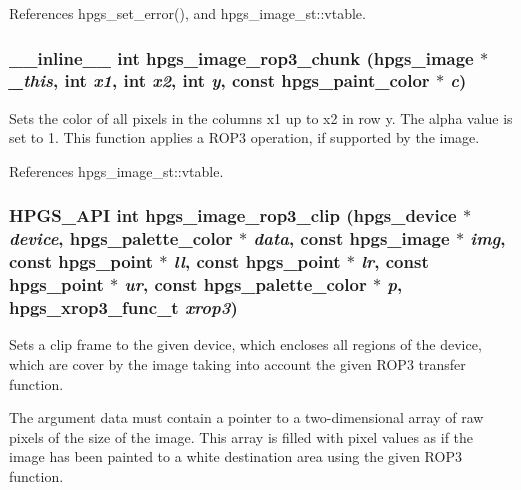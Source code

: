 References hpgs\_\-set\_\-error(), and hpgs\_\-image\_\-st::vtable.

\subsubsection[{hpgs\_\-image\_\-rop3\_\-chunk}]{\setlength{\rightskip}{0pt plus 5cm}\_\-\_\-inline\_\-\_\- int hpgs\_\-image\_\-rop3\_\-chunk ({\bf hpgs\_\-image} $\ast$ {\em \_\-this}, \/  int {\em x1}, \/  int {\em x2}, \/  int {\em y}, \/  const {\bf hpgs\_\-paint\_\-color} $\ast$ {\em c})\hspace{0.3cm}{\ttfamily  [static]}}\label{group__image_gafa793929911f17d232d6936bf64f1a3a}
Sets the color of all pixels in the columns {\ttfamily x1} up to {\ttfamily x2} in row {\ttfamily y}. The alpha value is set to 1. This function applies a ROP3 operation, if supported by the image. 

References hpgs\_\-image\_\-st::vtable.

\subsubsection[{hpgs\_\-image\_\-rop3\_\-clip}]{\setlength{\rightskip}{0pt plus 5cm}HPGS\_\-API int hpgs\_\-image\_\-rop3\_\-clip ({\bf hpgs\_\-device} $\ast$ {\em device}, \/  {\bf hpgs\_\-palette\_\-color} $\ast$ {\em data}, \/  const {\bf hpgs\_\-image} $\ast$ {\em img}, \/  const {\bf hpgs\_\-point} $\ast$ {\em ll}, \/  const {\bf hpgs\_\-point} $\ast$ {\em lr}, \/  const {\bf hpgs\_\-point} $\ast$ {\em ur}, \/  const {\bf hpgs\_\-palette\_\-color} $\ast$ {\em p}, \/  hpgs\_\-xrop3\_\-func\_\-t {\em xrop3})}\label{group__image_ga31be12e9a8d10fa5c07bcd43a830b77b}
Sets a clip frame to the given device, which encloses all regions of the device, which are cover by the image taking into account the given ROP3 transfer function.

The argument {\ttfamily data} must contain a pointer to a two-\/dimensional array of raw pixels of the size of the image. This array is filled with pixel values as if the image has been painted to a white destination area using the given ROP3 function.

